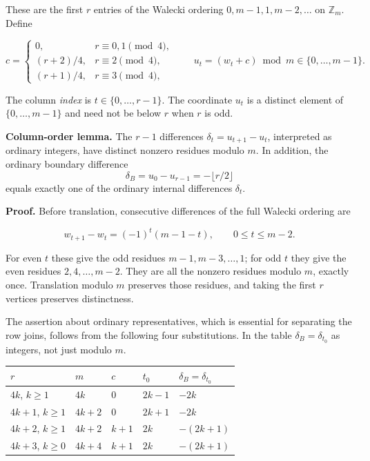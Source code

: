 \documentclass[11pt,a4paper]{article}
\newcommand{\statementstart}{\par\addvspace{6pt plus 1pt minus 1pt}\noindent}
\newcommand{\labelledparagraphstart}{\par\addvspace{3pt plus 1pt minus 1pt}\noindent}
\begin{document}
These are the first \(r\) entries of the Walecki ordering \(0,m-1,1,m-2,\ldots\) on \(\mathbb Z_m\). Define

\begin{equation}
c=\begin{cases}
0,&r\equiv0,1\pmod4,\\
(r+2)/4,&r\equiv2\pmod4,\\
(r+1)/4,&r\equiv3\pmod4,
\end{cases}
\qquad u_t=(w_t+c)\bmod m\in\{0,\ldots,m-1\}.
\tag{L4}\label{eq:L4}
\end{equation}

The column \emph{index} is \(t\in \{0,\ldots ,r-1\}\). The coordinate \(u_t\) is a distinct element of \(\{0,\ldots ,m-1\}\) and need not be below \(r\) when \(r\) is odd.

\statementstart\textbf{Column-order lemma.} The \(r-1\) differences \(\delta _t=u_{t+1}-u_t\), interpreted as ordinary integers, have distinct nonzero residues modulo \(m\). In addition, the ordinary boundary difference \begin{equation}
\delta_B=u_0-u_{r-1}=-\lfloor r/2\rfloor
\tag{L5}\label{eq:L5}
\end{equation} equals exactly one of the ordinary internal differences \(\delta _t\).

\labelledparagraphstart\textbf{Proof.} Before translation, consecutive differences of the full Walecki ordering are

\[
w_{t+1}-w_t=(-1)^t(m-1-t),\qquad 0\le t\le m-2.
\]

For even \(t\) these give the odd residues \(m-1,m-3,\ldots ,1\); for odd \(t\) they give the even residues \(2,4,\ldots ,m-2\). They are all the nonzero residues modulo \(m\), exactly once. Translation modulo \(m\) preserves those residues, and taking the first \(r\) vertices preserves distinctness.

The assertion about ordinary representatives, which is essential for separating the row joins, follows from the following four substitutions. In the table \(\delta _B=\delta _{t_0}\) as integers, not just modulo \(m\).

\begin{longtable}[]{@{}lllll@{}}
\toprule\noalign{}
\(r\) & \(m\) & \(c\) & \(t_0\) & \(\delta _B=\delta _{t_0}\) \\
\midrule\noalign{}
\endhead
\bottomrule\noalign{}
\endlastfoot
\(4k\), \(k\geq 1\) & \(4k\) & \(0\) & \(2k-1\) & \(-2k\) \\
\(4k+1\), \(k\geq 1\) & \(4k+2\) & \(0\) & \(2k+1\) & \(-2k\) \\
\(4k+2\), \(k\geq 1\) & \(4k+2\) & \(k+1\) & \(2k\) & \(-(2k+1)\) \\
\(4k+3\), \(k\geq 0\) & \(4k+4\) & \(k+1\) & \(2k\) & \(-(2k+1)\) \\
\end{longtable}
\end{document}
